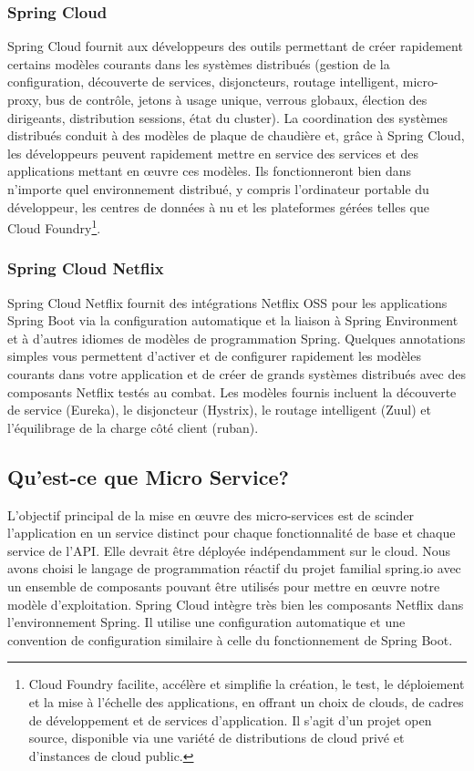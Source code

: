  \subsubsection{Spring Cloud}
 Spring Cloud fournit aux développeurs des outils permettant de créer rapidement certains modèles courants dans les systèmes distribués (gestion de la configuration, découverte de services, disjoncteurs, routage intelligent, micro-proxy, bus de contrôle, jetons à usage unique, verrous globaux, élection des dirigeants, distribution sessions, état du cluster). La coordination des systèmes distribués conduit à des modèles de plaque de chaudière et, grâce à Spring Cloud, les développeurs peuvent rapidement mettre en service des services et des applications mettant en œuvre ces modèles. Ils fonctionneront bien dans n’importe quel environnement distribué, y compris l’ordinateur portable du développeur, les centres de données à nu et les plateformes gérées telles que Cloud Foundry\footnote[1]{\samepage Cloud Foundry facilite, accélère et simplifie la création, le test, le déploiement et la mise à l'échelle des applications, en offrant un choix de clouds, de cadres de développement et de services d'application. Il s'agit d'un projet open source, disponible via une variété de distributions de cloud privé et d'instances de cloud public.}.
 
 
  \subsubsection{Spring Cloud Netflix}
 Spring Cloud Netflix fournit des intégrations Netflix OSS pour les applications Spring Boot via la configuration automatique et la liaison à Spring Environment et à d'autres idiomes de modèles de programmation Spring. Quelques annotations simples vous permettent d'activer et de configurer rapidement les modèles courants dans votre application et de créer de grands systèmes distribués avec des composants Netflix testés au combat. Les modèles fournis incluent la découverte de service (Eureka), le disjoncteur (Hystrix), le routage intelligent (Zuul) et l’équilibrage de la charge côté client (ruban).
 
 \subsection{ Qu'est-ce que Micro Service?}

 L'objectif principal de la mise en œuvre des micro-services est de scinder l'application en un service distinct pour chaque fonctionnalité de base et chaque service de l'API. Elle devrait être déployée indépendamment sur le cloud. Nous avons choisi le langage de programmation réactif du projet familial spring.io avec un ensemble de composants pouvant être utilisés pour mettre en œuvre notre modèle d'exploitation. Spring Cloud intègre très bien les composants Netflix dans l’environnement Spring. Il utilise une configuration automatique et une convention de configuration similaire à celle du fonctionnement de Spring Boot.


